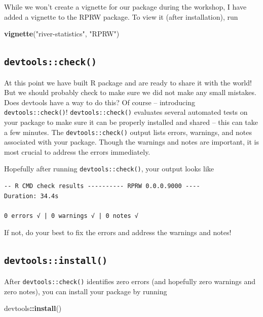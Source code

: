 \documentclass[
]{book}
\newenvironment{Shaded}{\begin{snugshade}}{\end{snugshade}}
\newcommand{\KeywordTok}[1]{\textcolor[rgb]{0.13,0.29,0.53}{\textbf{#1}}}
\newcommand{\NormalTok}[1]{#1}
\newcommand{\OperatorTok}[1]{\textcolor[rgb]{0.81,0.36,0.00}{\textbf{#1}}}
\newcommand{\StringTok}[1]{\textcolor[rgb]{0.31,0.60,0.02}{#1}}
\begin{document}
While we won't create a vignette for our package during the workshop, I have added a vignette to the RPRW package. To view it (after installation), run

\begin{Shaded}
\begin{Highlighting}[]
\KeywordTok{vignette}\NormalTok{(}\StringTok{"river-statistics"}\NormalTok{, }\StringTok{"RPRW"}\NormalTok{)}
\end{Highlighting}
\end{Shaded}

\hypertarget{check}{%
\subsection{\texorpdfstring{\texttt{devtools::check()}}{devtools::check()}}\label{check}}

At this point we have built R package and are ready to share it with the world! But we should probably check to make sure we did not make any small mistakes. Does devtools have a way to do this? Of course -- introducing \texttt{devtools::check()}! \texttt{devtools::check()} evaluates several automated tests on your package to make sure it can be properly installed and shared -- this can take a few minutes. The \texttt{devtools::check()} output lists errors, warnings, and notes associated with your package. Though the warnings and notes are important, it is most crucial to address the errors immediately.

Hopefully after running \texttt{devtools::check()}, your output looks like

\begin{verbatim}
-- R CMD check results ---------- RPRW 0.0.0.9000 ----
Duration: 34.4s

0 errors √ | 0 warnings √ | 0 notes √
\end{verbatim}

If not, do your best to fix the errors and address the warnings and notes!

\hypertarget{install}{%
\subsection{\texorpdfstring{\texttt{devtools::install()}}{devtools::install()}}\label{install}}

After \texttt{devtools::check()} identifies zero errors (and hopefully zero warnings and zero notes), you can install your package by running

\begin{Shaded}
\begin{Highlighting}[]
\NormalTok{devtools}\OperatorTok{::}\KeywordTok{install}\NormalTok{()}
\end{Highlighting}
\end{Shaded}
\end{document}
